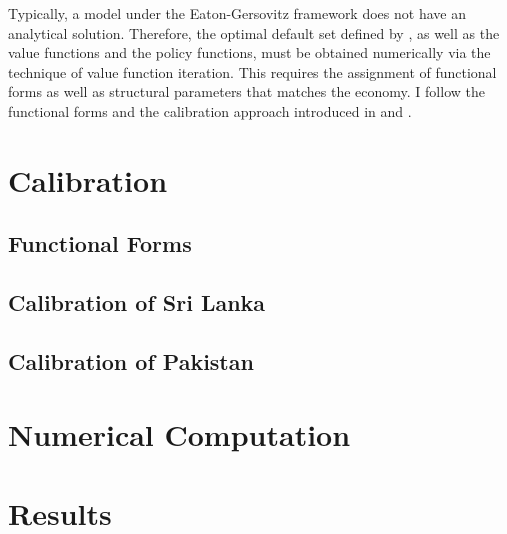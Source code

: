 Typically, a model under the Eaton-Gersovitz framework does not have an analytical solution. Therefore, the optimal default set defined by , as well as the value functions and the policy functions, must be obtained numerically via the technique of value function iteration.
This requires the assignment of functional forms as well as structural parameters that matches the economy.
I follow the functional forms and the calibration approach introduced in \citet{Na-18} and \citet{Hinrichsen_2020-chapter4}.

\section{Calibration}
\label{sec: calibration}

\subsection*{Functional Forms}


\subsection*{Calibration of Sri Lanka}


\subsection*{Calibration of Pakistan}


\section{Numerical Computation}
\label{sec:computation}


\section{Results}